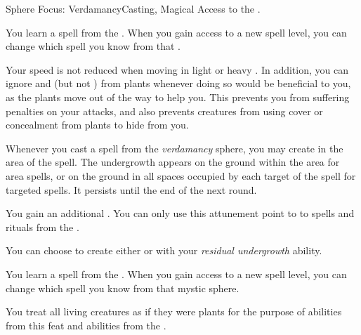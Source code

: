     \begin{feat}{Sphere Focus: Verdamancy}{Casting, Magical}
        \featpre Access to the  .

         You learn a spell from the  .
        When you gain access to a new spell level, you can change which spell you know from that .

         Your speed is not reduced when moving in light or heavy .
        In addition, you can ignore  and  (but not ) from plants whenever doing so would be beneficial to you, as the plants move out of the way to help you.
        This prevents you from suffering penalties on your attacks, and also prevents creatures from using cover or concealment from plants to hide from you.

         Whenever you cast a spell from the \textit{verdamancy} sphere, you may create  in the area of the spell.
        The undergrowth appears on the ground within the area for area spells, or on the ground in all spaces occupied by each target of the spell for targeted spells.
        It persists until the end of the next round.

         You gain an additional .
        You can only use this attunement point to  to spells and rituals from the  .

         You can choose to create either  or  with your \textit{residual undergrowth} ability.

         You learn a spell from the  .
        When you gain access to a new spell level, you can change which spell you know from that mystic sphere.

         You treat all living creatures as if they were plants for the purpose of abilities from this feat and abilities from the  .
    \end{feat}

